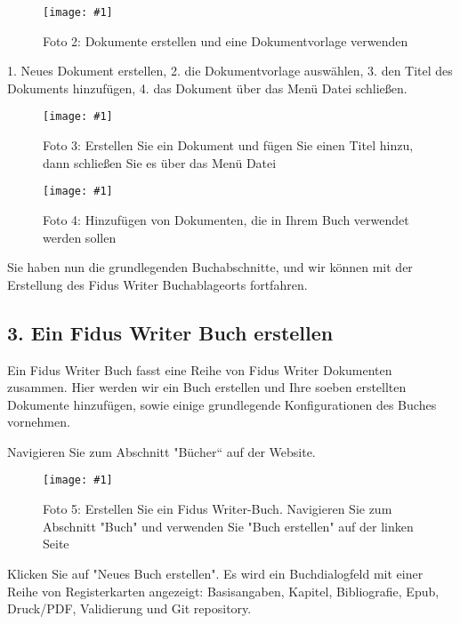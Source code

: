 \documentclass{article}
\newlength{\imgwidth}
\newcommand\scaledgraphics[2]{%
                
\settowidth{\imgwidth}{\texttt{[image: \#1]}}%
                
\setlength{\imgwidth}{\minof{\imgwidth}{#2\textwidth}}%
                
\texttt{[image: \#1]}%
                
}
\begin{document}
\begin{figure}
\scaledgraphics{252b11a1-2b67-4b4a-8445-2a5277dab934.png}{1}
\caption*{Foto 2: Dokumente erstellen und eine Dokumentvorlage verwenden}\label{F79921751}
\end{figure}


1. Neues Dokument erstellen, 2. die Dokumentvorlage auswählen, 3. den Titel des Dokuments hinzufügen, 4. das Dokument über das Menü Datei schließen.

\begin{figure}
\scaledgraphics{73c56889-a204-4b6b-829f-f064a973bccd.png}{1}
\caption*{Foto 3: Erstellen Sie ein Dokument und fügen Sie einen Titel hinzu, dann schließen Sie es über das Menü Datei}\label{F9841231}
\end{figure}

\begin{figure}
\scaledgraphics{58dc095f-4699-43ab-b89b-d4b6898c429e.png}{1}
\caption*{Foto 4: Hinzufügen von Dokumenten, die in Ihrem Buch verwendet werden sollen}\label{F19682601}
\end{figure}


Sie haben nun die grundlegenden Buchabschnitte, und wir können mit der Erstellung des Fidus Writer Buchablageorts fortfahren.


\subsection{3. Ein Fidus Writer Buch erstellen}\label{H853693}



Ein Fidus Writer Buch fasst eine Reihe von Fidus Writer Dokumenten zusammen. Hier werden wir ein Buch erstellen und Ihre soeben erstellten Dokumente hinzufügen, sowie einige grundlegende Konfigurationen des Buches vornehmen.


Navigieren Sie zum Abschnitt "Bücher“ auf der Website.

\begin{figure}
\scaledgraphics{8b772d23-b634-4ed7-99cb-592991930b27.png}{1}
\caption*{Foto 5: Erstellen Sie ein Fidus Writer-Buch. Navigieren Sie zum Abschnitt "Buch" und verwenden Sie "Buch erstellen" auf der linken Seite}\label{F33363991}
\end{figure}


Klicken Sie auf "Neues Buch erstellen". Es wird ein Buchdialogfeld mit einer Reihe von Registerkarten angezeigt: Basisangaben, Kapitel, Bibliografie, Epub, Druck/PDF, Validierung und Git repository.
\end{document}
